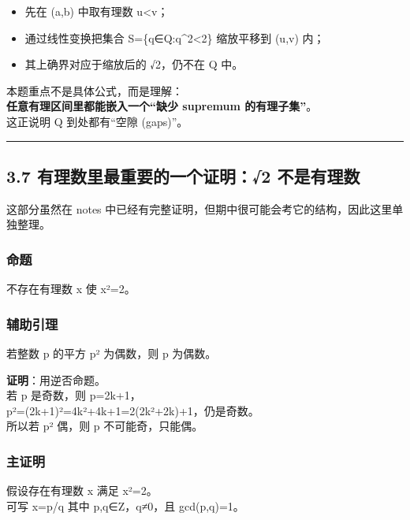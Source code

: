 \documentclass[
  11pt,
]{article}
\providecommand{\tightlist}{%
  \setlength{\itemsep}{0pt}\setlength{\parskip}{0pt}}
\begin{document}
\begin{itemize}
\tightlist
\item
  先在 (a,b) 中取有理数 u\textless v；
\item
  通过线性变换把集合 S=\{q∈Q:q\^{}2\textless2\} 缩放平移到 (u,v) 内；
\item
  其上确界对应于缩放后的 √2，仍不在 Q 中。
\end{itemize}

本题重点不是具体公式，而是理解：\\
\textbf{任意有理区间里都能嵌入一个``缺少 supremum 的有理子集''}。\\
这正说明 Q 到处都有``空隙 (gaps)''。

\begin{center}\rule{0.5\linewidth}{0.5pt}\end{center}

\subsection{3.7 有理数里最重要的一个证明：√2
不是有理数}\label{ux6709ux7406ux6570ux91ccux6700ux91cdux8981ux7684ux4e00ux4e2aux8bc1ux660e2-ux4e0dux662fux6709ux7406ux6570}

这部分虽然在 notes
中已经有完整证明，但期中很可能会考它的结构，因此这里单独整理。

\subsubsection{命题}\label{ux547dux9898}

不存在有理数 x 使 x²=2。

\subsubsection{辅助引理}\label{ux8f85ux52a9ux5f15ux7406}

若整数 p 的平方 p² 为偶数，则 p 为偶数。

\textbf{证明}：用逆否命题。\\
若 p 是奇数，则 p=2k+1，\\
p²=(2k+1)²=4k²+4k+1=2(2k²+2k)+1，仍是奇数。\\
所以若 p² 偶，则 p 不可能奇，只能偶。

\subsubsection{主证明}\label{ux4e3bux8bc1ux660e}

假设存在有理数 x 满足 x²=2。\\
可写 x=p/q 其中 p,q∈Z，q≠0，且 gcd(p,q)=1。
\end{document}
